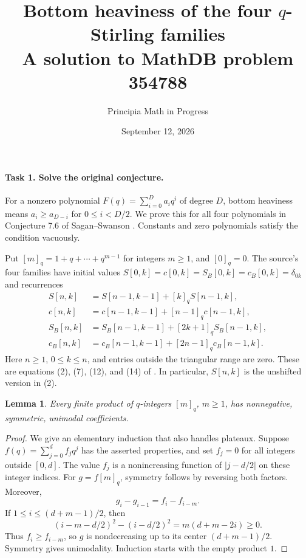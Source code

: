 \documentclass[11pt]{article}
\title{Bottom heaviness of the four \(q\)-Stirling families\\
\large A solution to MathDB problem 354788}
\author{Principia Math in Progress}
\date{September 12, 2026}
\newtheorem{lemma}[theorem]{Lemma}
\newcommand{\qi}[1]{[#1]_q}
\begin{document}
\maketitle

\paragraph{Task 1. Solve the original conjecture.}
For a nonzero polynomial \(F(q)=\sum_{i=0}^{D}a_iq^i\) of degree \(D\),
bottom heaviness means \(a_i\ge a_{D-i}\) for \(0\le i<D/2\).
We prove this for all four polynomials in Conjecture 7.6 of
Sagan--Swanson \cite{SS}. Constants and zero polynomials satisfy the
condition vacuously.

Put \(\qi{m}=1+q+\cdots+q^{m-1}\) for integers \(m\ge1\), and
\(\qi{0}=0\). The source's four families have initial values
\(S[0,k]=c[0,k]=S_B[0,k]=c_B[0,k]=\delta_{0k}\) and recurrences
\begin{align}
 S[n,k]&=S[n-1,k-1]+\qi{k}S[n-1,k], \label{eq:A2}\\
 c[n,k]&=c[n-1,k-1]+\qi{n-1}c[n-1,k], \label{eq:A1}\\
 S_B[n,k]&=S_B[n-1,k-1]+\qi{2k+1}S_B[n-1,k], \label{eq:B2}\\
 c_B[n,k]&=c_B[n-1,k-1]+\qi{2n-1}c_B[n-1,k]. \label{eq:B1}
\end{align}
Here \(n\ge1\), \(0\le k\le n\), and entries outside the triangular
range are zero. These are equations (2), (7), (12), and (14) of
\cite{SS}. In particular, \(S[n,k]\) is the unshifted version in (2).

\begin{lemma}\label{lem:product}
Every finite product of \(q\)-integers \(\qi{m}\), \(m\ge1\), has
nonnegative, symmetric, unimodal coefficients.
\end{lemma}
\begin{proof}
We give an elementary induction that also handles plateaux. Suppose
\(f(q)=\sum_{j=0}^{d}f_jq^j\) has the asserted properties, and set
\(f_j=0\) for all integers outside \([0,d]\).
The value \(f_j\) is a nonincreasing function of
\(\lvert j-d/2\rvert\) on these integer indices. For
\(g=f\qi{m}\), symmetry follows by reversing both factors. Moreover,
\[
 g_i-g_{i-1}=f_i-f_{i-m}.
\]
If \(1\le i\le(d+m-1)/2\), then
\[
 (i-m-d/2)^2-(i-d/2)^2=m(d+m-2i)\ge0.
\]
Thus \(f_i\ge f_{i-m}\), so \(g\) is nondecreasing up to its center
\((d+m-1)/2\). Symmetry gives unimodality. Induction starts with the
empty product \(1\).
\end{proof}
\end{document}
